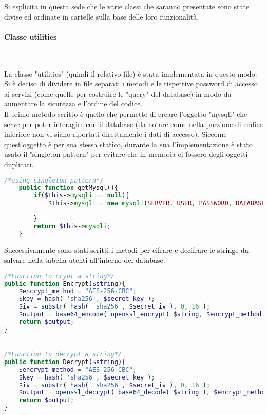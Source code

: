 Si esplicita in questa sede che le varie classi che saranno presentate sono state divise ed ordinate in cartelle sulla base delle loro funzionalità.\\

\paragraph{Classe utilities}\leavevmode\\
\raggedright
La classe "utilities" (quindi il relativo file) è stata implementata in questo modo:\\
Si è deciso di dividere in file separati i metodi e le rispettive password di accesso ai servizi (come quelle per costruire le "query" del database) in modo da aumentare la sicurezza e l'ordine del codice.\\
Il primo metodo scritto è quello che permette di creare l'oggetto "mysqli" che serve per poter interagire con il database (da notare come nella porzione di codice inferiore non vi siano riportati direttamente i dati di accesso). Siccome quest'oggetto è per sua stessa statico, durante la sua l'implementazione è stato usato il "singleton pattern" per evitare che in memoria ci fossero degli oggetti duplicati.\\

\begin{lstlisting}[language=php]
	/*using singleton pattern*/
	public function getMysql(){
		if($this->mysqli == null){
			$this->mysqli = new mysqli(SERVER, USER, PASSWORD, DATABASE);
			
		}
		return $this->mysqli;
	}
\end{lstlisting}

\raggedright
\textcolor{black}{Successivamente sono stati scritti i metodi per cifrare e decifrare le stringe da salvare nella tabella utenti all'interno del database.}\\

\begin{lstlisting}[language=php]
/*Function to crypt a string*/
public function Encrypt($string){
	$encrypt_method = "AES-256-CBC";
	$key = hash( 'sha256', $secret_key );
	$iv = substr( hash( 'sha256', $secret_iv ), 0, 16 );
	$output = base64_encode( openssl_encrypt( $string, $encrypt_method, $key, 0, $iv ) );
	return $output;
}


/*Function to decrypt a string*/
public function Decrypt($string){
	$encrypt_method = "AES-256-CBC";
	$key = hash( 'sha256', $secret_key );
	$iv = substr( hash( 'sha256', $secret_iv ), 0, 16 );
	$output = openssl_decrypt( base64_decode( $string ), $encrypt_method, $key, 0, $iv );
	return $output;
}
\end{lstlisting}


